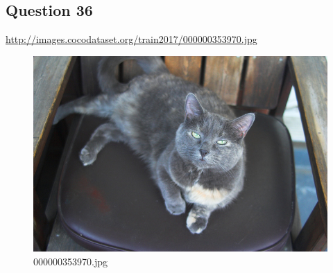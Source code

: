 \subsection*{Question 36}
\url{http://images.cocodataset.org/train2017/000000353970.jpg}
    \begin{figure}[h]
        \centering
        \includegraphics[width=0.8\linewidth]{../image set/easy/000000353970.jpg}
        \caption{000000353970.jpg}
    \end{figure}
